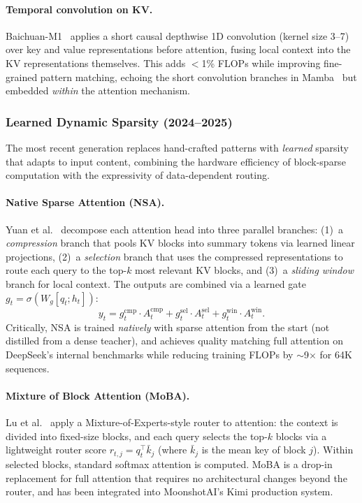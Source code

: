 \documentclass[11pt,a4paper]{article}
\begin{document}
\paragraph{Temporal convolution on KV.}
Baichuan-M1~\cite{baichuan2025m1} applies a short causal depthwise 1D convolution (kernel size 3--7) over key and value representations before attention, fusing local context into the KV representations themselves. This adds $<$1\% FLOPs while improving fine-grained pattern matching, echoing the short convolution branches in Mamba~\cite{gu2024mamba} but embedded \emph{within} the attention mechanism.

\subsubsection{Learned Dynamic Sparsity (2024--2025)}

The most recent generation replaces hand-crafted patterns with \emph{learned} sparsity that adapts to input content, combining the hardware efficiency of block-sparse computation with the expressivity of data-dependent routing.

\paragraph{Native Sparse Attention (NSA).}
Yuan et al.~\cite{yuan2025nsa} decompose each attention head into three parallel branches: (1)~a \emph{compression} branch that pools KV blocks into summary tokens via learned linear projections, (2)~a \emph{selection} branch that uses the compressed representations to route each query to the top-$k$ most relevant KV blocks, and (3)~a \emph{sliding window} branch for local context. The outputs are combined via a learned gate $g_t = \sigma(W_g [q_t; h_t])$:
\begin{equation}
y_t = g_t^{\text{cmp}} \cdot A_t^{\text{cmp}} + g_t^{\text{sel}} \cdot A_t^{\text{sel}} + g_t^{\text{win}} \cdot A_t^{\text{win}}.
\label{eq:nsa}
\end{equation}
Critically, NSA is trained \emph{natively} with sparse attention from the start (not distilled from a dense teacher), and achieves quality matching full attention on DeepSeek's internal benchmarks while reducing training FLOPs by $\sim$9$\times$ for 64K sequences.

\paragraph{Mixture of Block Attention (MoBA).}
Lu et al.~\cite{lu2025moba} apply a Mixture-of-Experts-style router to attention: the context is divided into fixed-size blocks, and each query selects the top-$k$ blocks via a lightweight router score $r_{t,j} = q_t^\top \bar{k}_j$ (where $\bar{k}_j$ is the mean key of block $j$). Within selected blocks, standard softmax attention is computed. MoBA is a drop-in replacement for full attention that requires no architectural changes beyond the router, and has been integrated into MoonshotAI's Kimi production system.
\end{document}
